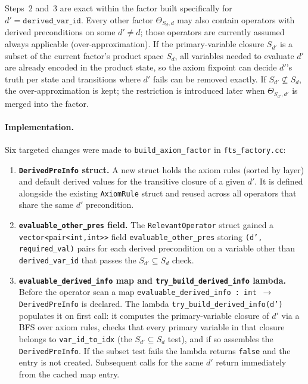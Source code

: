 \documentclass[11pt,a4paper]{article}
\begin{document}
\begin{itemize}
    Steps~2 and~3 are exact within the factor built specifically for
    $d' = \mathtt{derived\_var\_id}$.  Every other factor $\Theta_{S_d,d}$
    may also contain operators with derived preconditions on some
    $d' \neq d$; those operators are currently assumed always applicable
    (over-approximation).  If the primary-variable closure $S_{d'}$ is a
    subset of the current factor's product space $S_d$, all variables needed
    to evaluate $d'$ are already encoded in the product state, so the axiom
    fixpoint can decide $d'$'s truth per state and transitions where $d'$
    fails can be removed exactly.  If $S_{d'} \not\subseteq S_d$, the
    over-approximation is kept; the restriction is introduced later when
    $\Theta_{S_{d'},d'}$ is merged into the factor.

    \paragraph{Implementation.}
    Six targeted changes were made to \texttt{build\_axiom\_factor} in
    \texttt{fts\_factory.cc}:

    \begin{enumerate}
      \item \textbf{\texttt{DerivedPreInfo} struct.}
        A new struct holds the axiom rules (sorted by layer) and default
        derived values for the transitive closure of a given $d'$.  It is
        defined alongside the existing \texttt{AxiomRule} struct and reused
        across all operators that share the same $d'$ precondition.

      \item \textbf{\texttt{evaluable\_other\_pres} field.}
        The \texttt{RelevantOperator} struct gained a
        \texttt{vector<pair<int,int>>} field \texttt{evaluable\_other\_pres}
        storing \texttt{(d', required\_val)} pairs for each derived
        precondition on a variable other than \texttt{derived\_var\_id} that
        passes the $S_{d'} \subseteq S_d$ check.

      \item \textbf{\texttt{evaluable\_derived\_info} map and
        \texttt{try\_build\_derived\_info} lambda.}
        Before the operator scan a map
        \texttt{evaluable\_derived\_info : int $\to$ DerivedPreInfo} is
        declared.  The lambda \texttt{try\_build\_derived\_info(d')} populates
        it on first call: it computes the primary-variable closure of $d'$
        via a BFS over axiom rules, checks that every primary variable in
        that closure belongs to \texttt{var\_id\_to\_idx} (the $S_{d'}
        \subseteq S_d$ test), and if so assembles the \texttt{DerivedPreInfo}.
        If the subset test fails the lambda returns \texttt{false} and the
        entry is not created.  Subsequent calls for the same $d'$ return
        immediately from the cached map entry.


\end{enumerate}
\end{itemize}
\end{document}
